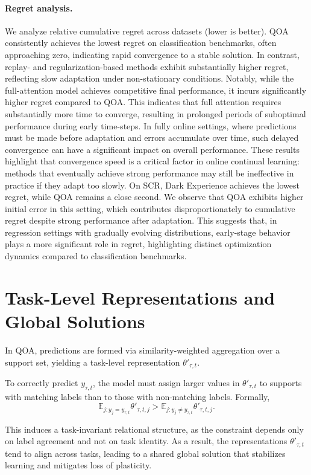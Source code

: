 \documentclass{article}
\begin{document}
\paragraph{Regret analysis.}
We analyze relative cumulative regret across datasets (lower is better). QOA consistently achieves the lowest regret on classification benchmarks, often approaching zero, indicating rapid convergence to a stable solution. In contrast, replay- and regularization-based methods exhibit substantially higher regret, reflecting slow adaptation under non-stationary conditions.
Notably, while the full-attention model achieves competitive final performance, it incurs significantly higher regret compared to QOA. This indicates that full attention requires substantially more time to converge, resulting in prolonged periods of suboptimal performance during early time-steps. In fully online settings, where predictions must be made before adaptation and errors accumulate over time, such delayed convergence can have a significant impact on overall performance. These results highlight that convergence speed is a critical factor in online continual learning: methods that eventually achieve strong performance may still be ineffective in practice if they adapt too slowly.
On SCR, Dark Experience achieves the lowest regret, while QOA remains a close second. We observe that QOA exhibits higher initial error in this setting, which contributes disproportionately to cumulative regret despite strong performance after adaptation. This suggests that, in regression settings with gradually evolving distributions, early-stage behavior plays a more significant role in regret, highlighting distinct optimization dynamics compared to classification benchmarks.

\section{Task-Level Representations and Global Solutions}
\label{sec:task_representations}
In QOA, predictions are formed via similarity-weighted aggregation over a support set, yielding a task-level representation $\theta'_{\tau,t}$.

To correctly predict $y_{\tau,t}$, the model must assign larger values in $\theta'_{\tau,t}$ to supports with matching labels than to those with non-matching labels. Formally,
\[
\mathbb{E}_{j : y_j = y_{\tau,t}} \theta'_{\tau,t,j}
>
\mathbb{E}_{j : y_j \neq y_{\tau,t}} \theta'_{\tau,t,j}.
\]

This induces a task-invariant relational structure, as the constraint depends only on label agreement and not on task identity. As a result, the representations $\theta'_{\tau,t}$ tend to align across tasks, leading to a shared global solution that stabilizes learning and mitigates loss of plasticity.
\end{document}
